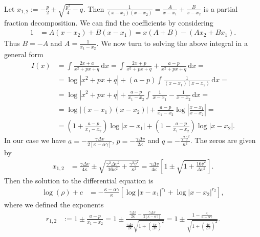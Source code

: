 \documentclass[english, parskip=full]{scrartcl}
\newcommand{\intx}{}
\newcommand{\kla}{}
\newcommand{\klam}{}
\begin{document}
Let $x_{1,2} := -\frac{p}{2} \pm \sqrt{\frac{p^2}{4} - q}$.
Then $\frac{1}{(x-x_1)(x-x_2)} = \frac{A}{x-x_1} + \frac{B}{x-x_2}$ is a partial fraction decomposition.
We can find the coefficients by considering
\begin{align}
1 &= A(x-x_2) + B(x-x_1) = x(A+B) - (Ax_2 + Bx_1).
\end{align}
Thus $B=-A$ and $A=\frac{1}{x_1-x_2}$.
We now turn to solving the above integral in a general form
\begin{align}
I(x) &= \intx\int_{ }^{ } \frac{2x + a}{x^2 + px + q}\, \mathrm{d}x = \intx\int_{ }^{ } \frac{2x + p}{x^2+px+q} + \frac{a-p}{x^2+px+q} \, \mathrm{d}x = \\
&= \log\left\vert x^2+px+q\right\vert + (a-p) \intx\int_{ }^{ } \frac{1}{(x-x_1)(x-x_2)}\, \mathrm{d}x = \\
&= \log\left\vert x^2+px+q\right\vert + \frac{a-p}{x_1-x_2} \intx\int_{ }^{ } \frac{1}{x-x_1} - \frac{1}{x-x_2}\, \mathrm{d}x = \\
&= \log\left\vert (x-x_1)(x-x_2) \right\vert + \frac{a-p}{x_1-x_2} \log\left\vert \frac{x-x_1}{x-x_2} \right\vert = \\
&= \kla\left( 1 + \frac{a-p}{x_1-x_2} \right) \log |x-x_1| + \kla\left( 1 - \frac{a-p}{x_1-x_2} \right) \log |x-x_2|.
\end{align}
In our case we have $a = -\frac{\gamma\Delta v}{2[\kappa-\alpha \gamma]}$, $p=-\frac{\gamma\Delta v}{2\kappa}$ and $q=-\frac{\gamma^2\bar{v}^2}{\kappa^2}$.
The zeros are given by
\begin{align}
x_{1,2} &= \frac{\gamma\Delta v}{4\kappa} \pm \sqrt{\frac{\gamma^2\Delta v^2}{16\kappa^2} + \frac{\gamma^2\bar{v}^2}{\kappa^2}} = \frac{\gamma \Delta v}{4\kappa} \klam\left[ 1 \pm \sqrt{1 + \frac{16\bar{v}^2}{\Delta v^2}} \right].
\end{align}
Then the solution to the differential equation is
\begin{align}
\log (\rho) + c &= -\frac{\kappa - \alpha\gamma}{\kappa} \klam\left[ \log |x-x_1|^{r_1} + \log |x-x_2|^{r_2} \right],
\end{align}
where we defined the exponents 
\begin{align}
r_{1,2} &:= 1 \pm \frac{a-p}{x_1-x_2} = 1 \pm \frac{\frac{\gamma\Delta v}{2\kappa} - \frac{\gamma\Delta v}{2[\kappa - \alpha\gamma]}}{\frac{\gamma\Delta v}{2\kappa}\sqrt{1 + \kla\left( \frac{4\bar{v}}{\Delta v} \right)^2}} = 1 \pm \frac{1 - \frac{\kappa}{\kappa - \alpha\gamma}}{\sqrt{1 + \kla\left( \frac{4\bar{v}}{\Delta v} \right)^2}}.
\end{align}
\end{document}
